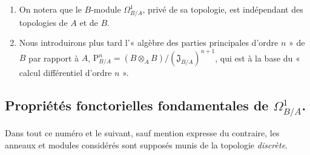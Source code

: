 \begin{remarks}[20.4.14]
\label{0.20.4.14-fr}
\begin{enumerate}
  \item[\rm(i)] On notera que le $B$-module $\Omega^1_{B/A}$, privé de sa
  topologie, est indépendant des topologies de $A$ et de $B$.
  \item[\rm(ii)] Nous introduirons plus tard l'« algèbre des parties
  principales d'ordre $n$ » de $B$ par rapport à $A$,
  $\mathrm{P}^n_{B/A}=(B\otimes_A B)/(\mathfrak{J}_{B/A})^{n+1}$, qui est à
  la base du « calcul différentiel d'ordre $n$ ».
\end{enumerate}
\end{remarks}


\subsection{Propriétés fonctorielles fondamentales de
\texorpdfstring{$\Omega^1_{B/A}$}{Omega1(B/A)}.}
\label{subsection:0.20.5-fr}

\begin{env}[20.5.1]
\label{0.20.5.1-fr}
Dans tout ce numéro et le suivant, sauf mention expresse du contraire, les
anneaux et modules considérés sont supposés munis de la topologie
\emph{discrète}.
\end{env}

